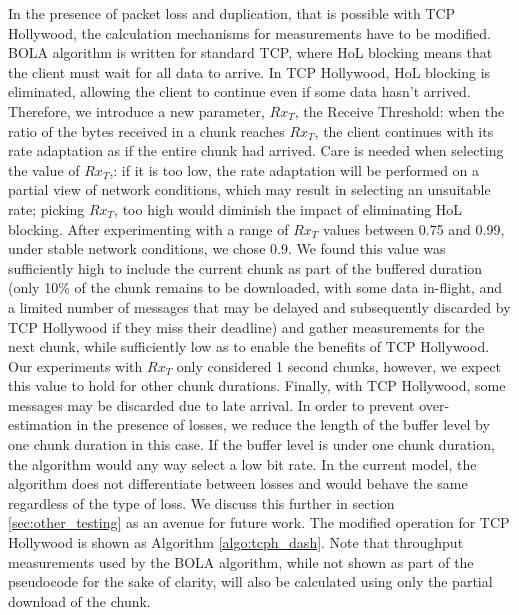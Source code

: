 In the presence of packet loss and duplication, that is possible with TCP Hollywood, the calculation 
mechanisms for measurements have to be modified. BOLA algorithm is written for standard TCP, where HoL blocking means that the client must wait for all data to arrive. In TCP Hollywood, HoL blocking is eliminated, allowing the client to continue even if some data hasn't arrived. Therefore, we introduce a new parameter, $Rx_{T}$, the Receive Threshold: when the ratio of the bytes received in a chunk reaches $Rx_{T}$, the client continues with its rate adaptation as if the entire chunk had arrived. Care is needed when selecting the value of $Rx_{T}$,: if it is too low, the rate adaptation will be performed on a partial view of network conditions, which may result in selecting an unsuitable rate; picking $Rx_{T}$, too high would diminish the impact of eliminating HoL blocking. After experimenting with a range of $Rx_{T}$ values between 0.75 and 0.99, under stable network conditions, we chose 0.9. We found this value was sufficiently high to include the current chunk as part of the buffered duration (only 10\% of the chunk remains to be downloaded, with some data in-flight, and a limited number of messages that may be delayed and subsequently discarded by TCP Hollywood if they miss their deadline) and gather measurements for the next chunk, while sufficiently low as to enable the benefits of TCP Hollywood. Our experiments with $Rx_{T}$ only considered 1 second chunks, however, we expect this value to hold for other chunk durations. Finally, with TCP Hollywood, some messages may be discarded due to late arrival. In order to prevent over-estimation in the presence of losses, we reduce the length of the buffer level by one chunk duration in this case. If the buffer level is under one chunk duration, the algorithm would any way select a low bit rate. In the current model, the algorithm does not differentiate between losses and would behave the same regardless of the type of loss. We discuss this further in section \ref{sec:other_testing} as an avenue for future work. The modified operation for TCP Hollywood is shown as Algorithm \ref{algo:tcph_dash}. Note that throughput measurements used by the BOLA algorithm, while not shown as part of the pseudocode for the sake of clarity, will also be calculated using only the partial download of the chunk. 

